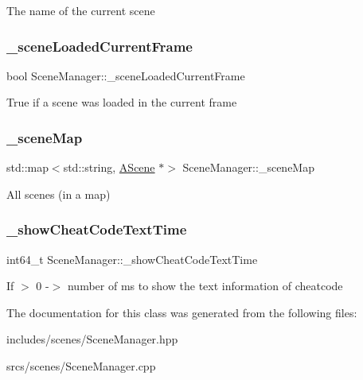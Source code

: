 The name of the current scene \mbox{\label{class_scene_manager_af1a54a7d8f6a8fb3f5e392de6d04c3bf}} 
\subsubsection{\texorpdfstring{\+\_\+scene\+Loaded\+Current\+Frame}{\_sceneLoadedCurrentFrame}}
{\footnotesize\ttfamily bool Scene\+Manager\+::\+\_\+scene\+Loaded\+Current\+Frame\hspace{0.3cm}{\ttfamily [protected]}}

True if a scene was loaded in the current frame \mbox{\label{class_scene_manager_aa5ff91a38f3de01ce3fb41ac6cc62d40}} 
\subsubsection{\texorpdfstring{\+\_\+scene\+Map}{\_sceneMap}}
{\footnotesize\ttfamily std\+::map$<$std\+::string, \hyperlink{class_a_scene}{A\+Scene} $\ast$$>$ Scene\+Manager\+::\+\_\+scene\+Map\hspace{0.3cm}{\ttfamily [protected]}}

All scenes (in a map) \mbox{\label{class_scene_manager_a27e08ee627a10d7b2e1d3ebf2ea7d2bb}} 
\subsubsection{\texorpdfstring{\+\_\+show\+Cheat\+Code\+Text\+Time}{\_showCheatCodeTextTime}}
{\footnotesize\ttfamily int64\+\_\+t Scene\+Manager\+::\+\_\+show\+Cheat\+Code\+Text\+Time\hspace{0.3cm}{\ttfamily [protected]}}

If $>$ 0 -\/$>$ number of ms to show the text information of cheatcode 

The documentation for this class was generated from the following files\+:\begin{DoxyCompactItemize}
\item 
includes/scenes/Scene\+Manager.\+hpp\item 
srcs/scenes/Scene\+Manager.\+cpp\end{DoxyCompactItemize}

